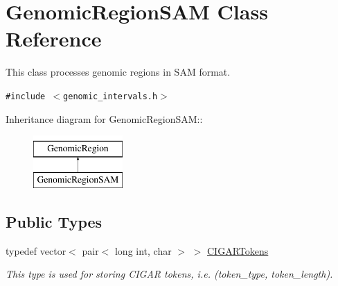 \hypertarget{classGenomicRegionSAM}{
\section{GenomicRegionSAM Class Reference}
\label{classGenomicRegionSAM}
}
This class processes genomic regions in SAM format.  


{\tt \#include $<$genomic\_\-intervals.h$>$}

Inheritance diagram for GenomicRegionSAM::\begin{figure}[H]
\begin{center}
\leavevmode
\includegraphics[height=2cm]{classGenomicRegionSAM}
\end{center}
\end{figure}
\subsection*{Public Types}
\begin{CompactItemize}
\item 
\hypertarget{classGenomicRegionSAM_adf8580c5362304ab4866fa76a59df96}{
typedef vector$<$ pair$<$ long int, char $>$ $>$ \hyperlink{classGenomicRegionSAM_adf8580c5362304ab4866fa76a59df96}{CIGARTokens}}
\label{classGenomicRegionSAM_adf8580c5362304ab4866fa76a59df96}

\begin{CompactList}\small\item\em This type is used for storing CIGAR tokens, i.e. (token\_\-type, token\_\-length). \item\end{CompactList}\end{CompactItemize}
